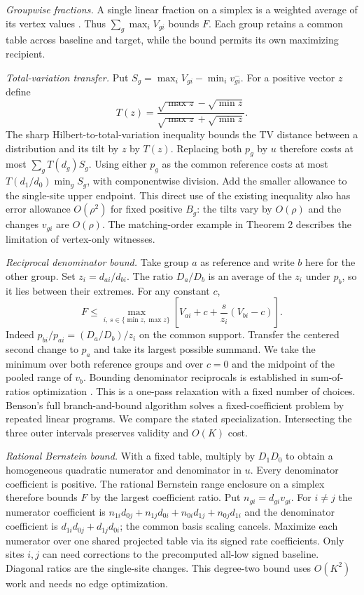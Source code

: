 \documentclass[11pt]{article}
\begin{document}
\emph{Groupwise fractions.} A single linear fraction on a simplex is a weighted average of its vertex values \cite{charnes}. Thus $\sum_g\max_i V_{gi}$ bounds $F$. Each group retains a common table across baseline and target, while the bound permits its own maximizing recipient.

\emph{Total-variation transfer.} Put $S_g=\max_i V_{gi}-\min_i v^-_{gi}$. For a positive vector $z$ define
\[
 T(z)=\frac{\sqrt{\max z}-\sqrt{\min z}}{\sqrt{\max z}+\sqrt{\min z}}.
\]
 The sharp Hilbert-to-total-variation inequality \cite{cohen} bounds the TV distance between a distribution and its tilt by $z$ by $T(z)$. Replacing both $p_g$ by $u$ therefore costs at most $\sum_g T(d_g)S_g$. Using either $p_g$ as the common reference costs at most $T(d_1/d_0)\min_g S_g$, with componentwise division. Add the smaller allowance to the single-site upper endpoint. This direct use of the existing inequality also has error allowance $O(\rho^2)$ for fixed positive $B_g$: the tilts vary by $O(\rho)$ and the changes $v_{gi}$ are $O(\rho)$. The matching-order example in Theorem 2 describes the limitation of vertex-only witnesses.

\emph{Reciprocal denominator bound.} Take group $a$ as reference and write $b$ here for the other group. Set $z_i=d_{ai}/d_{bi}$. The ratio $D_a/D_b$ is an average of the $z_i$ under $p_b$, so it lies between their extremes. For any constant $c$,
\[
 F\le \max_{i,\,s\in\{\min z,\max z\}}
       \left[V_{ai}+c+\frac{s}{z_i}(V_{bi}-c)\right].
\]
Indeed $p_{bi}/p_{ai}=(D_a/D_b)/z_i$ on the common support. Transfer the centered second change to $p_a$ and take its largest possible summand. We take the minimum over both reference groups and over $c=0$ and the midpoint of the pooled range of $v_b$. Bounding denominator reciprocals is established in sum-of-ratios optimization \cite{benson}. This is a one-pass relaxation with a fixed number of choices. Benson's full branch-and-bound algorithm solves a fixed-coefficient problem by repeated linear programs. We compare the stated specialization. Intersecting the three outer intervals preserves validity and $O(K)$ cost.

\emph{Rational Bernstein bound.} With a fixed table, multiply by $D_1 D_0$ to obtain a homogeneous quadratic numerator and denominator in $u$. Every denominator coefficient is positive. The rational Bernstein range enclosure on a simplex \cite{bernstein} therefore bounds $F$ by the largest coefficient ratio. Put $n_{gi}=d_{gi}v_{gi}$. For $i\ne j$ the numerator coefficient is $n_{1i}d_{0j}+n_{1j}d_{0i}+n_{0i}d_{1j}+n_{0j}d_{1i}$ and the denominator coefficient is $d_{1i}d_{0j}+d_{1j}d_{0i}$; the common basis scaling cancels. Maximize each numerator over one shared projected table via its signed rate coefficients. Only sites $i,j$ can need corrections to the precomputed all-low signed baseline. Diagonal ratios are the single-site changes. This degree-two bound uses $O(K^2)$ work and needs no edge optimization.
\end{document}
